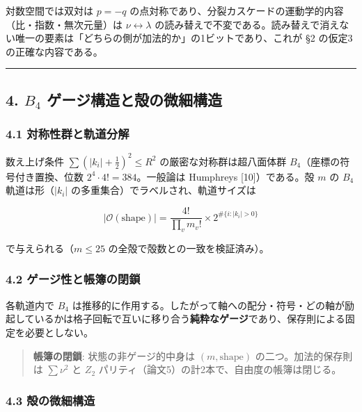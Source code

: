 \documentclass[
]{ltjsarticle}
\begin{document}
対数空間では双対は \(p=-q\)
の点対称であり、分裂カスケードの運動学的内容（比・指数・無次元量）は
\(\nu\leftrightarrow\lambda\)
の読み替えで不変である。読み替えで消えない唯一の要素は「どちらの側が加法的か」の1ビットであり、これが
§2 の仮定3の正確な内容である。

\begin{center}\rule{0.5\linewidth}{0.5pt}\end{center}

\subsection{\texorpdfstring{4. \(B_4\)
ゲージ構造と殻の微細構造}{4. B\_4 ゲージ構造と殻の微細構造}}\label{b_4-ux30b2ux30fcux30b8ux69cbux9020ux3068ux6bbbux306eux5faeux7d30ux69cbux9020}

\subsubsection{4.1
対称性群と軌道分解}\label{ux5bfeux79f0ux6027ux7fa4ux3068ux8eccux9053ux5206ux89e3}

数え上げ条件 \(\sum(|k_i|+\tfrac12)^2\le R^2\)
の厳密な対称群は超八面体群 \(B_4\)（座標の符号付き置換、位数
\(2^4\cdot4!=384\)。一般論は Humphreys {[}10{]}）である。殻 \(m\) の
\(B_4\) 軌道は形（\(|k_i|\) の多重集合）でラベルされ、軌道サイズは

\[
|\mathcal{O}(\text{shape})|=\frac{4!}{\prod_v m_v!}\times 2^{\#\{i:|k_i|>0\}}
\]

で与えられる（\(m\le25\) の全殻で殻数との一致を検証済み）。

\subsubsection{4.2
ゲージ性と帳簿の閉鎖}\label{ux30b2ux30fcux30b8ux6027ux3068ux5e33ux7c3fux306eux9589ux9396}

各軌道内で \(B_4\)
は推移的に作用する。したがって軸への配分・符号・どの軸が励起しているかは格子回転で互いに移り合う\textbf{純粋なゲージ}であり、保存則による固定を必要としない。

\begin{quote}
\textbf{帳簿の閉鎖}: 状態の非ゲージ的中身は \((m,\text{shape})\)
の二つ。加法的保存則は \(\sum\nu^2\) と \(Z_2\)
パリティ（論文5）の計2本で、自由度の帳簿は閉じる。
\end{quote}

\subsubsection{4.3
殻の微細構造}\label{ux6bbbux306eux5faeux7d30ux69cbux9020}
\end{document}
